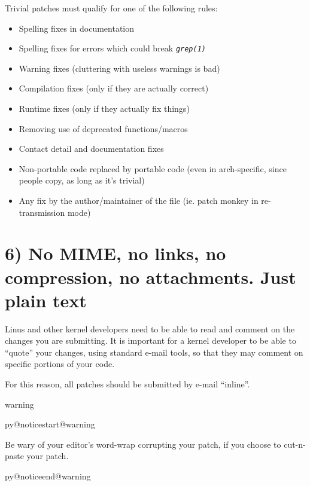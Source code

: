\documentclass[a4paper,8pt,english]{sphinxmanual}
\makeatletter
\renewenvironment{notice}[2]{%
          \def\py@noticetype{#1}
          \begin{coloredbox}{#1}
          \bf\it
          \par\strong{#2}
          \csname py@noticestart@#1\endcsname
        }
	{
          \csname py@noticeend@\py@noticetype\endcsname
          \end{coloredbox}
        }
\makeatother
\begin{document}
Trivial patches must qualify for one of the following rules:
\begin{itemize}
\item {} 
Spelling fixes in documentation

\item {} 
Spelling fixes for errors which could break \emph{\texttt{grep(1)}}

\item {} 
Warning fixes (cluttering with useless warnings is bad)

\item {} 
Compilation fixes (only if they are actually correct)

\item {} 
Runtime fixes (only if they actually fix things)

\item {} 
Removing use of deprecated functions/macros

\item {} 
Contact detail and documentation fixes

\item {} 
Non-portable code replaced by portable code (even in arch-specific,
since people copy, as long as it's trivial)

\item {} 
Any fix by the author/maintainer of the file (ie. patch monkey
in re-transmission mode)

\end{itemize}


\section{6) No MIME, no links, no compression, no attachments.  Just plain text}
\label{process/submitting-patches:no-mime-no-links-no-compression-no-attachments-just-plain-text}
Linus and other kernel developers need to be able to read and comment
on the changes you are submitting.  It is important for a kernel
developer to be able to ``quote'' your changes, using standard e-mail
tools, so that they may comment on specific portions of your code.

For this reason, all patches should be submitted by e-mail ``inline''.

\begin{notice}{warning}{Warning:}
Be wary of your editor's word-wrap corrupting your patch,
if you choose to cut-n-paste your patch.
\end{notice}
\end{document}
